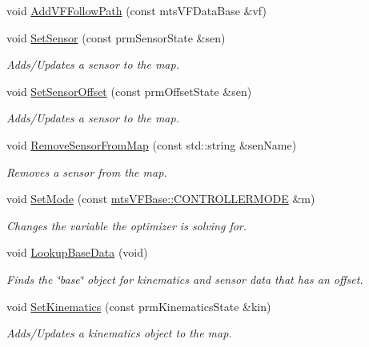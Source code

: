 \begin{DoxyCompactItemize}
void \hyperlink{classmts_v_f_controller_a74c1977b8fac09db4dfe92590a285ac1}{Add\-V\-F\-Follow\-Path} (const mts\-V\-F\-Data\-Base \&vf)
\item 
void \hyperlink{classmts_v_f_controller_a4bc9686480a583054ca0615a4bbc8b46}{Set\-Sensor} (const prm\-Sensor\-State \&sen)
\begin{DoxyCompactList}\small\item\em Adds/\-Updates a sensor to the map. \end{DoxyCompactList}\item 
void \hyperlink{classmts_v_f_controller_a7da3be1c2a5cd3e2f94fa13adecbdffc}{Set\-Sensor\-Offset} (const prm\-Offset\-State \&sen)
\begin{DoxyCompactList}\small\item\em Adds/\-Updates a sensor to the map. \end{DoxyCompactList}\item 
void \hyperlink{classmts_v_f_controller_a3c00912ec4d7055cc61bd6cf61b51c2c}{Remove\-Sensor\-From\-Map} (const std\-::string \&sen\-Name)
\begin{DoxyCompactList}\small\item\em Removes a sensor from the map. \end{DoxyCompactList}\item 
void \hyperlink{classmts_v_f_controller_a9b2a191244f649c4648a1f3e555ceaae}{Set\-Mode} (const \hyperlink{classmts_v_f_base_a742dd08f8b70bafeb746cec14d9ee974}{mts\-V\-F\-Base\-::\-C\-O\-N\-T\-R\-O\-L\-L\-E\-R\-M\-O\-D\-E} \&m)
\begin{DoxyCompactList}\small\item\em Changes the variable the optimizer is solving for. \end{DoxyCompactList}\item 
void \hyperlink{classmts_v_f_controller_a84f09db2d388d29d5224a30bdb68d76f}{Lookup\-Base\-Data} (void)
\begin{DoxyCompactList}\small\item\em Finds the \char`\"{}base\char`\"{} object for kinematics and sensor data that has an offset. \end{DoxyCompactList}\item 
void \hyperlink{classmts_v_f_controller_af32d53c8bc0cdb3db21c9887cd759c7a}{Set\-Kinematics} (const prm\-Kinematics\-State \&kin)
\begin{DoxyCompactList}\small\item\em Adds/\-Updates a kinematics object to the map. \end{DoxyCompactList}\item 

\end{DoxyCompactItemize}
